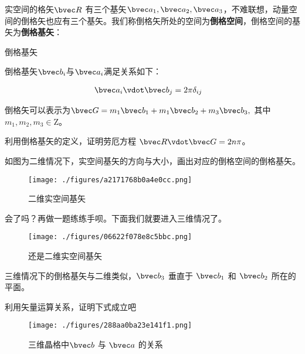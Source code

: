 实空间的格矢$\bvec R$ 有三个基矢$\bvec a_1, \bvec a_2, \bvec a_3$，不难联想，动量空间的倒格矢也应有三个基矢。我们称倒格矢所处的空间为\textbf{倒格空间}，倒格空间的基矢为\textbf{倒格基矢}：
\begin{definition}{倒格基矢}

倒格基矢$\bvec b_i$与$\bvec a_i$满足关系如下：

\begin{align}
\bvec a_i \vdot \bvec b_j  &= 2\pi \delta_{ij}
\end{align}


\end{definition}
倒格矢可以表示为$\bvec G = m_1 \bvec b_1 +  m_1 \bvec b_2 + m_3 \bvec b_3,~$其中$ m_1,m_2,m_3 \in \mathrm{Z}$。
\begin{exercise}{}
利用倒格基矢的定义，证明劳厄方程 $\bvec R \vdot \bvec G = 2 n \pi$。
\end{exercise}
\begin{exercise}{}
如图为二维情况下，实空间基矢的方向与大小，画出对应的倒格空间的倒格基矢。
\begin{figure}[ht]
\centering
\texttt{[image: ./figures/a2171768b0a4e0cc.png]}
\caption{二维实空间基矢} \label{fig_RecLat_5}
\end{figure}

\end{exercise}

\begin{exercise}{}
会了吗？再做一题练练手呗。下面我们就要进入三维情况了。
\begin{figure}[ht]
\centering
\texttt{[image: ./figures/06622f078e8c5bbc.png]}
\caption{还是二维实空间基矢} \label{fig_RecLat_6}
\end{figure}

\end{exercise}

三维情况下的倒格基矢与二维类似，$\bvec b_3$ 垂直于 $\bvec b_1 $ 和 $\bvec b_2 $ 所在的平面。
\begin{exercise}{}
利用矢量运算关系，证明下式成立吧
\begin{figure}[ht]
\centering
\texttt{[image: ./figures/288aa0ba23e141f1.png]}
\caption{三维晶格中$\bvec b$ 与 $\bvec a$ 的关系} \label{fig_RecLat_7}
\end{figure}

\end{exercise}